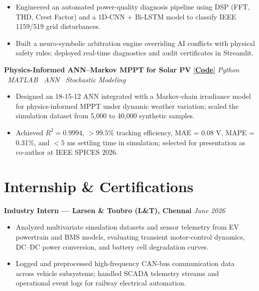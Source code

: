 \documentclass[10pt]{article}
\newcommand{\heading}[2]{%
    \noindent
    \textbf{#1}
    \hfill
    \textit{\small #2}
    \par
    \vspace{1pt}
}
\newcommand{\project}[3]{%
    \noindent
    \textbf{#1}
    \hspace{2pt}
    \href{#2}{\small[\textbf{Code}]}
    \hfill
    {\small\emph{#3}}
    \par
    \vspace{1pt}
}
\begin{document}
\begin{itemize}

\item Engineered an automated power-quality diagnosis pipeline using DSP (FFT, THD, Crest Factor) and a 1D-CNN + Bi-LSTM model to classify IEEE 1159/519 grid disturbances.

\item Built a neuro-symbolic arbitration engine overriding AI conflicts with physical safety rules; deployed real-time diagnostics and audit certificates in Streamlit.

\end{itemize}

\project
{Physics-Informed ANN--Markov MPPT for Solar PV}
{https://github.com/niranjan-crypt/Physics-Informed-ANN-Based-MPPT-with-Markov-Chain-Based-Dynamic-Validation-for-Photovoltaic-Systems}
{Python \textbullet\ MATLAB \textbullet\ ANN \textbullet\ Stochastic Modeling}

\begin{itemize}

\item Designed an 18-15-12 ANN integrated with a Markov-chain irradiance model for physics-informed MPPT under dynamic weather variation; scaled the simulation dataset from 5,000 to 40,000 synthetic samples.

\item Achieved $R^2=0.9994$, $>99.5\%$ tracking efficiency, MAE = 0.08 V, MAPE = 0.31\%, and $<5$ ms settling time in simulation; selected for presentation as co-author at IEEE SPICES 2026.

\end{itemize}

\section{Internship \& Certifications}

\heading
{Industry Intern --- Larsen \& Toubro (L\&T), Chennai}
{June 2026}

\begin{itemize}

\item Analyzed multivariate simulation datasets and sensor telemetry from EV powertrain and BMS models, evaluating transient motor-control dynamics, DC--DC power conversion, and battery cell degradation curves.

\item Logged and preprocessed high-frequency CAN-bus communication data across vehicle subsystems; handled SCADA telemetry streams and operational event logs for railway electrical automation.

\end{itemize}
\end{document}
